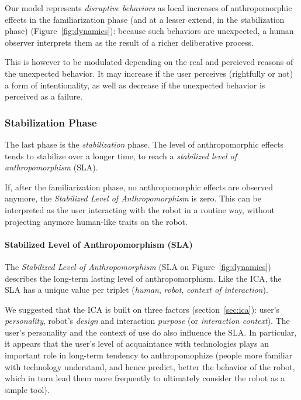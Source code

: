 \documentclass{acm_proc_article-sp}
\begin{document}
Our model represents \emph{disruptive behaviors} as local increases of
anthropomorphic effects in the familiarization phase (and at a lesser extend,
in the stabilization phase) (Figure~\ref{fig:dynamics}): because such behaviors
are unexpected, a human observer interprets them as the result of a richer
deliberative process.

This is however to be modulated depending on the real and percieved reasons of
the unexpected behavior. It may increase if the user perceives (rightfully or
not) a form of intentionality, as well as decrease if the unexpected behavior
is perceived as a failure.

\subsubsection{Stabilization Phase}
\label{sec:stabilization}

The last phase is the \emph{stabilization} phase. The level of anthropomorphic
effects tends to stabilize over a longer time, to reach a \emph{stabilized
level of anthropomorphism} (SLA).

If, after the familiarization phase, no anthropomorphic effects are observed
anymore, the \emph{Stabilized Level of Anthropomorphism} is zero. This can
be interpreted as the user interacting with the robot in a routine way, without
projecting anymore human-like traits on the robot.


\paragraph{Stabilized Level of Anthropomorphism (SLA)}

The \emph{Stabilized Level of Anthropomorphism} (SLA on
Figure~\ref{fig:dynamics}) describes the long-term lasting level of
anthropomorphism.  Like the ICA, the SLA has a unique value per triplet
(\emph{human}, \emph{robot}, \emph{context of interaction}).

We suggested that the ICA is built on three factors (section~\ref{sec:ica}):
user's \emph{personality}, robot's \emph{design} and interaction \emph{purpose}
(or \emph{interaction context}). The user's personality and the context of use
do also influence the SLA. In particular, it appears that the user's level of
acquaintance with technologies plays an important role in long-term tendency to
anthropomophize (people more familiar with technology understand, and hence
predict, better the behavior of the robot, which in turn lead them more
frequently to ultimately consider the robot as a simple tool).
\end{document}
